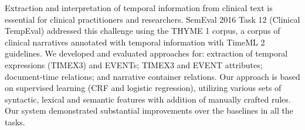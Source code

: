 Extraction and interpretation of temporal information from clinical text is essential for clinical practitioners and researchers. SemEval 2016 Task 12 (Clinical TempEval) addressed this challenge using the THYME 1 corpus, a corpus of clinical narratives annotated with temporal information with TimeML 2 guidelines. We developed and evaluated approaches for: extraction of temporal expressions (TIMEX3) and EVENTs; TIMEX3 and EVENT attributes; document-time relations; and narrative container relations. Our approach is based on supervised learning (CRF and logistic regression), utilizing various sets of syntactic, lexical and semantic features with addition of manually crafted rules. Our system demonstrated substantial improvements over the baselines in all the tasks.

